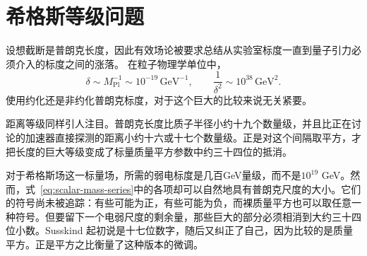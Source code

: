 \begin{classroomqa}
\end{classroomqa}

\begin{classroomqa}
\end{classroomqa}

\section{希格斯等级问题}

设想截断是普朗克长度，因此有效场论被要求总结从实验室标度一直到量子引力必须介入的标度之间的涨落。
在粒子物理学单位中，
\begin{equation}
\delta\sim M_{\mathrm{Pl}}^{-1}\sim10^{-19}\,\mathrm{GeV}^{-1},
\qquad
\frac{1}{\delta^2}\sim10^{38}\,\mathrm{GeV}^2.
\label{eq:planck-cutoff}
\end{equation}
使用约化还是非约化普朗克标度，对于这个巨大的比较来说无关紧要。

距离等级同样引人注目。普朗克长度比质子半径小约十九个数量级，并且比正在讨论的加速器直接探测的距离小约十六或十七个数量级。正是对这个间隔取平方，才把长度的巨大等级变成了标量质量平方参数中约三十四位的抵消。

对于希格斯场这一标量场，所需的弱电标度是几百GeV量级，而不是\(10^{19}\) GeV。然而，式~\eqref{eq:scalar-mass-series}中的各项却可以自然地具有普朗克尺度的大小。它们的符号尚未被追踪：有些可能为正，有些可能为负，而裸质量平方也可以取任意一种符号。但要留下一个电弱尺度的剩余量，那些巨大的部分必须相消到大约三十四位小数。Susskind 起初说是十七位数字，随后又纠正了自己，因为比较的是质量平方。正是平方之比衡量了这种版本的微调。

\begin{classroomqa}
\end{classroomqa}

